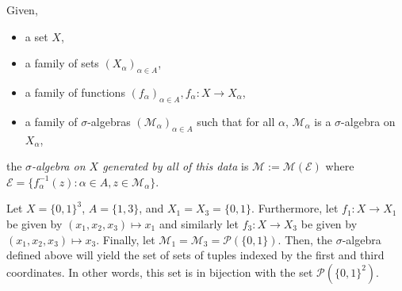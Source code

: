 \documentclass[11pt,leqno,oneside]{amsbook}
\numberwithin{thm}{section}
\renewcommand{\P}{\mathcal{P}}
\newcommand{\M}{\mathcal{M}}
\newcommand{\Ep}{\mathcal{E}}
\newcommand{\s}{$\sigma$-} %
\begin{document}
\begin{defn}\label{gen-sigma-alg-product}
  Given,
  \begin{itemize}
  \item a set $X$,
  \item a family of sets $(X_\alpha)_{\alpha \in A}$,
  \item a family of functions $(f_\alpha)_{\alpha \in A}, f_\alpha: X
    \to X_\alpha$,
  \item a family of \s algebras $(\M_\alpha)_{\alpha \in A}$ such
    that for all $\alpha$, $\M_\alpha$ is a \s algebra on
    $X_\alpha$,
  \end{itemize}
  the \emph{\s algebra on $X$ generated by all of this data} is
  $\M := \M(\Ep)$ where $\Ep = \{f_\alpha^{-1}(z) : \alpha \in A, z \in
  \M_\alpha\}$.
\end{defn}
\begin{example}
  Let $X = \{0,1\}^3$, $A = \{1,3\}$, and $X_1 = X_3 =
  \{0,1\}$. Furthermore, let $f_1\colon  X \to X_1$ be given by
  $(x_1,x_2,x_3) \mapsto x_1$ and similarly let $f_3\colon  X \to X_3$ be given by $(x_1,x_2,x_3) \mapsto x_3$. Finally, let
  $\M_1 = \M_3 = \P(\{0,1\})$. Then, the \s algebra defined
  above will yield the set of sets of tuples indexed by the first and
  third coordinates. In other words, this set is in bijection with the
  set $\P(\{0,1\}^2)$.
\end{example}
\end{document}
